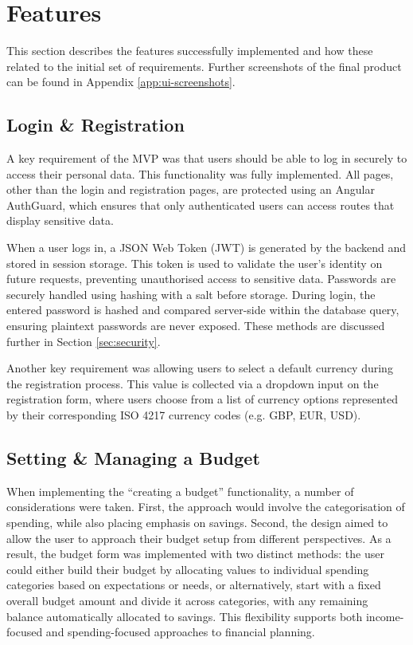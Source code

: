\documentclass{l4proj}
\begin{document}
\section{Features}
This section describes the features successfully implemented and how these related to the initial set of requirements. Further screenshots of the final product can be found in Appendix \ref{app:ui-screenshots}.

\subsection{Login \& Registration}
A key requirement of the MVP was that users should be able to log in securely to access their personal data. This functionality was fully implemented. All pages, other than the login and registration pages, are protected using an Angular AuthGuard, which ensures that only authenticated users can access routes that display sensitive data.

When a user logs in, a JSON Web Token (JWT) is generated by the backend and stored in session storage. This token is used to validate the user’s identity on future requests, preventing unauthorised access to sensitive data. Passwords are securely handled using hashing with a salt before storage. During login, the entered password is hashed and compared server-side within the database query, ensuring plaintext passwords are never exposed. These methods are discussed further in Section \ref{sec:security}.

Another key requirement was allowing users to select a default currency during the registration process. This value is collected via a dropdown input on the registration form, where users choose from a list of currency options represented by their corresponding ISO 4217 currency codes (e.g. GBP, EUR, USD).

\subsection{Setting \& Managing a Budget}
When implementing the “creating a budget” functionality, a number of considerations were taken. First, the approach would involve the categorisation of spending, while also placing emphasis on savings. Second, the design aimed to allow the user to approach their budget setup from different perspectives. As a result, the budget form was implemented with two distinct methods: the user could either build their budget by allocating values to individual spending categories based on expectations or needs, or alternatively, start with a fixed overall budget amount and divide it across categories, with any remaining balance automatically allocated to savings. This flexibility supports both income-focused and spending-focused approaches to financial planning.
\end{document}
